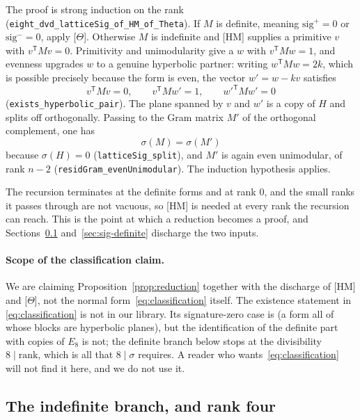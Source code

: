 The proof is strong induction on the rank
(\texttt{eight\_dvd\_latticeSig\_of\_HM\_of\_Theta}). If $M$ is definite,
meaning $\mathrm{sig}^{+} = 0$ or $\mathrm{sig}^{-} = 0$, apply
[$\Theta$]. Otherwise $M$ is indefinite and [HM] supplies a primitive
$v$ with $v^{\mathsf T} M v = 0$. Primitivity and unimodularity give a
$w$ with $v^{\mathsf T} M w = 1$, and evenness upgrades $w$ to a genuine
hyperbolic partner: writing $w^{\mathsf T} M w = 2k$, which is possible
precisely because the form is even, the vector $w' = w - k v$ satisfies
\begin{equation}
v^{\mathsf T} M v = 0, \qquad v^{\mathsf T} M w' = 1, \qquad
w'^{\mathsf T} M w' = 0
\label{eq:hyperbolic-pair}
\end{equation}
(\texttt{exists\_hyperbolic\_pair}). The plane spanned by $v$ and $w'$ is
a copy of $H$ and splits off orthogonally. Passing to the Gram matrix
$M'$ of the orthogonal complement, one has
\begin{equation}
\sigma(M) = \sigma(M')
\label{eq:split}
\end{equation}
because $\sigma(H) = 0$ (\texttt{latticeSig\_split}), and $M'$ is again
even unimodular, of rank $n-2$
(\texttt{residGram\_evenUnimodular}). The induction hypothesis applies.

The recursion terminates at the definite forms and at rank $0$, and the
small ranks it passes through are not vacuous, so [HM] is needed at every
rank the recursion can reach. This is the point at which a reduction
becomes a proof, and Sections~\ref{sec:sig-indefinite}
and~\ref{sec:sig-definite} discharge the two inputs.

\paragraph{Scope of the classification claim.}
We are claiming Proposition~\ref{prop:reduction} together with the
discharge of [HM] and [$\Theta$], not the normal
form~\eqref{eq:classification} itself. The existence statement in
\eqref{eq:classification} is not in our library. Its
signature-zero case is (a form all of whose blocks are hyperbolic
planes), but the identification of the definite part with copies of
$E_8$ is not; the definite branch below stops at the divisibility
$8 \mid \mathrm{rank}$, which is all that $8\mid\sigma$ requires. A
reader who wants~\eqref{eq:classification} will not find it here, and we
do not use it.

\subsection{The indefinite branch, and rank four}
\label{sec:sig-indefinite}

